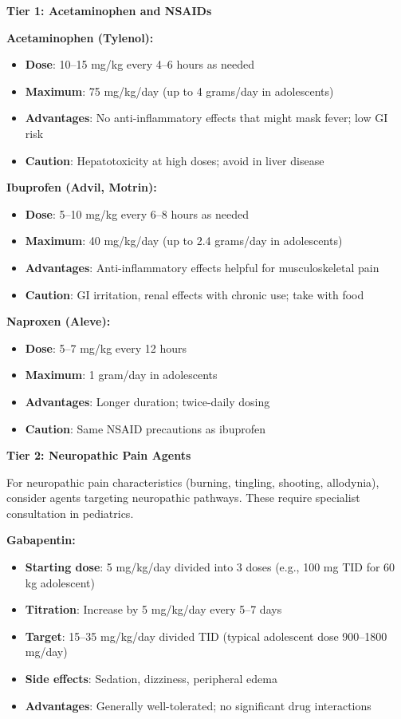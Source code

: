 \begin{protocol}
\label{protocol:ped-pain}

\textbf{Tier 1: Acetaminophen and NSAIDs}

\textbf{Acetaminophen (Tylenol):}
\begin{itemize}
    \item \textbf{Dose}: 10--15 mg/kg every 4--6 hours as needed
    \item \textbf{Maximum}: 75 mg/kg/day (up to 4 grams/day in adolescents)
    \item \textbf{Advantages}: No anti-inflammatory effects that might mask fever; low GI risk
    \item \textbf{Caution}: Hepatotoxicity at high doses; avoid in liver disease
\end{itemize}

\textbf{Ibuprofen (Advil, Motrin):}
\begin{itemize}
    \item \textbf{Dose}: 5--10 mg/kg every 6--8 hours as needed
    \item \textbf{Maximum}: 40 mg/kg/day (up to 2.4 grams/day in adolescents)
    \item \textbf{Advantages}: Anti-inflammatory effects helpful for musculoskeletal pain
    \item \textbf{Caution}: GI irritation, renal effects with chronic use; take with food
\end{itemize}

\textbf{Naproxen (Aleve):}
\begin{itemize}
    \item \textbf{Dose}: 5--7 mg/kg every 12 hours
    \item \textbf{Maximum}: 1 gram/day in adolescents
    \item \textbf{Advantages}: Longer duration; twice-daily dosing
    \item \textbf{Caution}: Same NSAID precautions as ibuprofen
\end{itemize}

\textbf{Tier 2: Neuropathic Pain Agents}

For neuropathic pain characteristics (burning, tingling, shooting, allodynia), consider agents targeting neuropathic pathways. These require specialist consultation in pediatrics.

\textbf{Gabapentin:}
\begin{itemize}
    \item \textbf{Starting dose}: 5 mg/kg/day divided into 3 doses (e.g., 100 mg TID for 60 kg adolescent)
    \item \textbf{Titration}: Increase by 5 mg/kg/day every 5--7 days
    \item \textbf{Target}: 15--35 mg/kg/day divided TID (typical adolescent dose 900--1800 mg/day)
    \item \textbf{Side effects}: Sedation, dizziness, peripheral edema
    \item \textbf{Advantages}: Generally well-tolerated; no significant drug interactions
\end{itemize}


\end{protocol}

